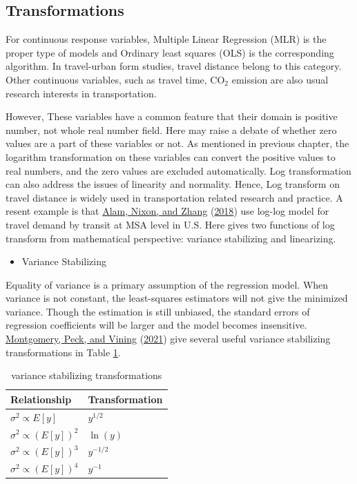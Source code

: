 \documentclass[
  11pt,
  openany]{memoir}
\providecommand{\tightlist}{%
  \setlength{\itemsep}{0pt}\setlength{\parskip}{0pt}}
\begin{document}
\hypertarget{transformations}{%
\subsection{Transformations}\label{transformations}}

For continuous response variables, Multiple Linear Regression (MLR) is the proper type of models and Ordinary least squares (OLS) is the corresponding algorithm. In travel-urban form studies, travel distance belong to this category. Other continuous variables, such as travel time, CO\(_2\) emission are also usual research interests in transportation.

However, These variables have a common feature that their domain is positive number, not whole real number field. Here may raise a debate of whether zero values are a part of these variables or not.
As mentioned in previous chapter, the logarithm transformation on these variables can convert the positive values to real numbers, and the zero values are excluded automatically.
Log transformation can also address the issues of linearity and normality.
Hence, Log transform on travel distance is widely used in transportation related research and practice. A resent example is that \protect\hyperlink{ref-alamFactorsAffectingTravel2018}{Alam, Nixon, and Zhang} (\protect\hyperlink{ref-alamFactorsAffectingTravel2018}{2018}) use log-log model for travel demand by transit at MSA level in U.S.
Here gives two functions of log transform from mathematical perspective: variance stabilizing and linearizing.

\begin{itemize}
\tightlist
\item
  Variance Stabilizing
\end{itemize}

Equality of variance is a primary assumption of the regression model.
When variance is not constant, the least-squares estimators will not give the minimized variance.
Though the estimation is still unbiased, the standard errors of regression coefficients will be larger and the model becomes insensitive.
\protect\hyperlink{ref-montgomeryIntroductionLinearRegression2021}{Montgomery, Peck, and Vining} (\protect\hyperlink{ref-montgomeryIntroductionLinearRegression2021}{2021}) give several useful variance stabilizing transformations in Table \ref{tab:transformation}.

\begin{table}

\caption{\label{tab:transformation}variance stabilizing transformations}
\centering
\fontsize{7}{9}\selectfont
\begin{tabular}[t]{ll}
\toprule
Relationship & Transformation\\
\midrule
$\sigma^2\propto E[y]$ & $y^{1/2}$\\
$\sigma^2\propto (E[y])^2$ & $\ln(y)$\\
$\sigma^2\propto (E[y])^3$ & $y^{-1/2}$\\
$\sigma^2\propto (E[y])^4$ & $y^{-1}$\\
\bottomrule
\end{tabular}
\end{table}
\end{document}
